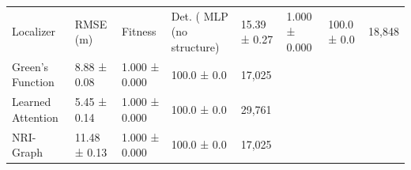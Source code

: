\begin{tabular}{lllll}
\toprule
Localizer & RMSE (m) & Fitness & Det. (%
\midrule
MLP (no structure) & 15.39 ± 0.27 & 1.000 ± 0.000 & 100.0 ± 0.0 & 18,848 \\
Green's Function & 8.88 ± 0.08 & 1.000 ± 0.000 & 100.0 ± 0.0 & 17,025 \\
Learned Attention & 5.45 ± 0.14 & 1.000 ± 0.000 & 100.0 ± 0.0 & 29,761 \\
NRI-Graph & 11.48 ± 0.13 & 1.000 ± 0.000 & 100.0 ± 0.0 & 17,025 \\
\bottomrule
\end{tabular}
